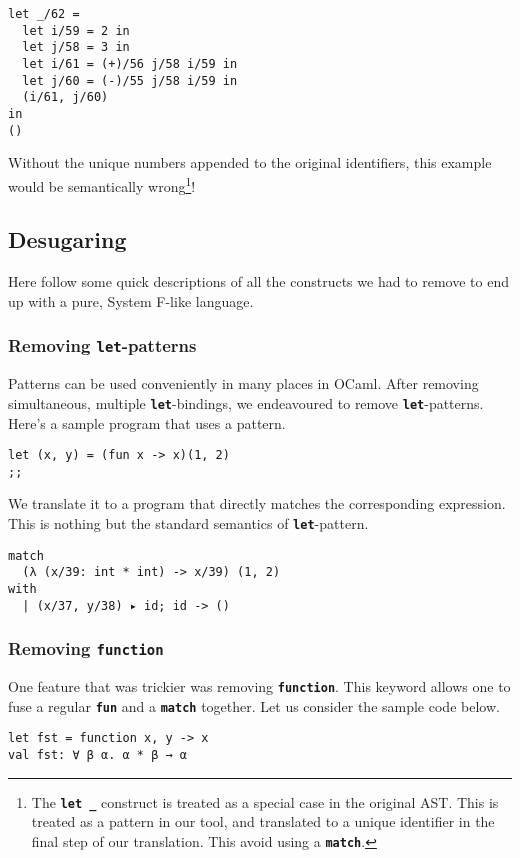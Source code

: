 \documentclass[10pt,a4paper,twoside,titlepage,twocolumn]{article}
\newcommand{\code}[1]{\textbf{\texttt{#1}}}
\begin{document}
\begin{verbatim}
let _/62 =
  let i/59 = 2 in
  let j/58 = 3 in
  let i/61 = (+)/56 j/58 i/59 in
  let j/60 = (-)/55 j/58 i/59 in
  (i/61, j/60)
in
()
\end{verbatim}

Without the unique numbers appended to the original identifiers, this example
would be semantically wrong\footnote{The \code{let \_} construct is treated as a
special case in the original AST. This is treated as a pattern in our tool, and
translated to a unique identifier in the final step of our translation. This
avoid using a \code{match}.}!

\subsection{Desugaring}

Here follow some quick descriptions of all the constructs we had to remove to
end up with a pure, System F-like language.

\subsubsection{Removing \code{let}-patterns}

Patterns can be used conveniently in many places in OCaml. After removing
simultaneous, multiple \code{let}-bindings, we endeavoured to remove
\code{let}-patterns. Here's a sample program that uses a pattern.

\begin{verbatim}
let (x, y) = (fun x -> x)(1, 2)
;;
\end{verbatim}
We translate it to a program that directly matches the corresponding expression.
This is nothing but the standard semantics of \code{let}-pattern.
\begin{verbatim}
match
  (λ (x/39: int * int) -> x/39) (1, 2)
with
  | (x/37, y/38) ▸ id; id -> ()
\end{verbatim}

\subsubsection{Removing \code{function}}

One feature that was trickier was removing \code{function}. This keyword allows
one to fuse a regular \code{fun} and a \code{match} together. Let us consider
the sample code below.

\begin{verbatim}
let fst = function x, y -> x
val fst: ∀ β α. α * β → α
\end{verbatim}
\end{document}
